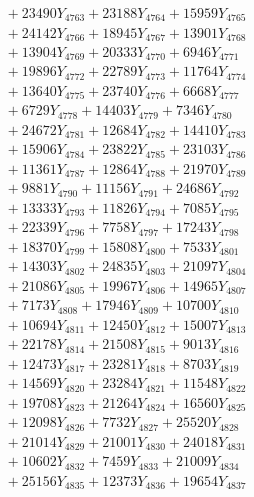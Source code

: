 \documentclass[a4paper,10pt]{article}
\begin{document}
{\begin{align}
&\;  + 23490 Y_{4763} + 23188 Y_{4764} + 15959 Y_{4765} \\[0.3ex]
&\;  + 24142 Y_{4766} + 18945 Y_{4767} + 13901 Y_{4768} \\[0.5ex]\allowbreak
&\;  + 13904 Y_{4769} + 20333 Y_{4770} + 6946 Y_{4771} \\[0.3ex]
&\;  + 19896 Y_{4772} + 22789 Y_{4773} + 11764 Y_{4774} \\[0.3ex]
&\;  + 13640 Y_{4775} + 23740 Y_{4776} + 6668 Y_{4777} \\[0.3ex]
&\;  + 6729 Y_{4778} + 14403 Y_{4779} + 7346 Y_{4780} \\[0.3ex]
&\;  + 24672 Y_{4781} + 12684 Y_{4782} + 14410 Y_{4783} \\[0.3ex]
&\;  + 15906 Y_{4784} + 23822 Y_{4785} + 23103 Y_{4786} \\[0.3ex]
&\;  + 11361 Y_{4787} + 12864 Y_{4788} + 21970 Y_{4789} \\[0.3ex]
&\;  + 9881 Y_{4790} + 11156 Y_{4791} + 24686 Y_{4792} \\[0.3ex]
&\;  + 13333 Y_{4793} + 11826 Y_{4794} + 7085 Y_{4795} \\[0.3ex]
&\;  + 22339 Y_{4796} + 7758 Y_{4797} + 17243 Y_{4798} \\[0.5ex]\allowbreak
&\;  + 18370 Y_{4799} + 15808 Y_{4800} + 7533 Y_{4801} \\[0.3ex]
&\;  + 14303 Y_{4802} + 24835 Y_{4803} + 21097 Y_{4804} \\[0.3ex]
&\;  + 21086 Y_{4805} + 19967 Y_{4806} + 14965 Y_{4807} \\[0.3ex]
&\;  + 7173 Y_{4808} + 17946 Y_{4809} + 10700 Y_{4810} \\[0.3ex]
&\;  + 10694 Y_{4811} + 12450 Y_{4812} + 15007 Y_{4813} \\[0.3ex]
&\;  + 22178 Y_{4814} + 21508 Y_{4815} + 9013 Y_{4816} \\[0.3ex]
&\;  + 12473 Y_{4817} + 23281 Y_{4818} + 8703 Y_{4819} \\[0.3ex]
&\;  + 14569 Y_{4820} + 23284 Y_{4821} + 11548 Y_{4822} \\[0.3ex]
&\;  + 19708 Y_{4823} + 21264 Y_{4824} + 16560 Y_{4825} \\[0.3ex]
&\;  + 12098 Y_{4826} + 7732 Y_{4827} + 25520 Y_{4828} \\[0.5ex]\allowbreak
&\;  + 21014 Y_{4829} + 21001 Y_{4830} + 24018 Y_{4831} \\[0.3ex]
&\;  + 10602 Y_{4832} + 7459 Y_{4833} + 21009 Y_{4834} \\[0.3ex]
&\;  + 25156 Y_{4835} + 12373 Y_{4836} + 19654 Y_{4837} \\[0.3ex]

\end{align}}
\end{document}
